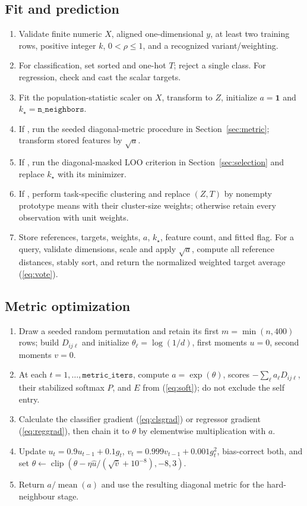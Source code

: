 \documentclass[conference]{IEEEtran}
\begin{document}
\subsection{Fit and prediction}
\begin{enumerate}
\item Validate finite numeric $X$, aligned one-dimensional $y$, at least two training rows, positive integer $k$, $0<\rho\leq1$, and a recognized variant/weighting.
\item For classification, set sorted  and one-hot $T$; reject a single class. For regression, check and cast the scalar targets.
\item Fit the population-statistic scaler on $X$, transform to $Z$, initialize $a=\mathbf1$ and $k_\star=\texttt{n\_neighbors}$.
\item If , run the seeded diagonal-metric procedure in Section~\ref{sec:metric}; transform stored features by $\sqrt a$.
\item If , run the diagonal-masked LOO criterion in Section~\ref{sec:selection} and replace $k_\star$ with its minimizer.
\item If , perform task-specific clustering and replace $(Z,T)$ by nonempty prototype means with their cluster-size weights; otherwise retain every observation with unit weights.
\item Store references, targets, weights, $a$, $k_\star$, feature count, and fitted flag. For a query, validate dimensions, scale and apply $\sqrt a$, compute all reference distances, stably sort, and return the normalized weighted target average (\ref{eq:vote}).
\end{enumerate}

\subsection{Metric optimization}
\begin{enumerate}
\item Draw a seeded random permutation and retain its first $m=\min(n,400)$ rows; build $D_{ij\ell}$ and initialize $\theta_\ell=\log(1/d)$, first moments $u=0$, second moments $v=0$.
\item At each $t=1,\ldots,\texttt{metric\_iters}$, compute $a=\exp(\theta)$, scores $-\sum_\ell a_\ell D_{ij\ell}$, their stabilized softmax $P$, and $E$ from (\ref{eq:soft}); do not exclude the self entry.
\item Calculate the classifier gradient (\ref{eq:clsgrad}) or regressor gradient (\ref{eq:reggrad}), then chain it to $\theta$ by elementwise multiplication with $a$.
\item Update $u_t=0.9u_{t-1}+0.1g_t$, $v_t=0.999v_{t-1}+0.001g_t^2$, bias-correct both, and set $\theta\leftarrow\operatorname{clip}(\theta-\eta\hat u/(\sqrt{\hat v}+10^{-8}),-8,3)$.
\item Return $a/\operatorname{mean}(a)$ and use the resulting diagonal metric for the hard-neighbour stage.
\end{enumerate}
\end{document}
